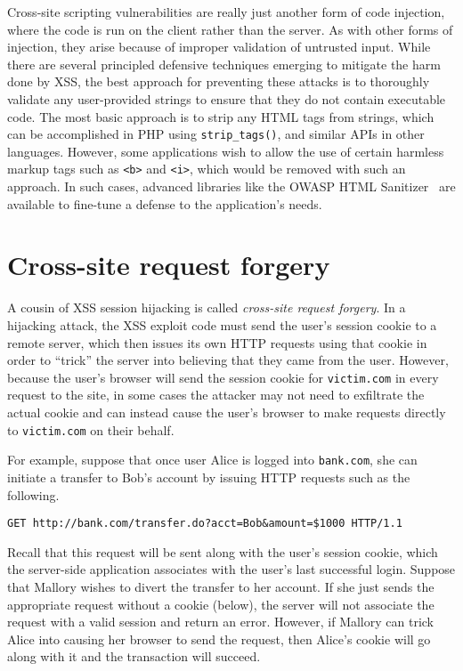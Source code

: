 \documentclass[11pt,twoside]{scrartcl}
\begin{document}
Cross-site scripting vulnerabilities are really just another form of code injection, where the code is run on the client rather than the server. As with other forms of injection, they arise because of improper validation of untrusted input. While there are several principled defensive techniques emerging to mitigate the harm done by XSS, the best approach for preventing these attacks is to thoroughly validate any user-provided strings to ensure that they do not contain executable code. The most basic approach is to strip any HTML tags from strings, which can be accomplished in PHP using \verb'strip_tags()', and similar APIs in other languages. However, some applications wish to allow the use of certain harmless markup tags such as \verb'<b>' and \verb'<i>', which would be removed with such an approach. In such cases, advanced libraries like the OWASP HTML Sanitizer~\cite{owasphtml} are available to fine-tune a defense to the application's needs.

\section{Cross-site request forgery} 
A cousin of XSS session hijacking is called \emph{cross-site request forgery}. In a hijacking attack, the XSS exploit code must send the user's session cookie to a remote server, which then issues its own HTTP requests using that cookie in order to ``trick'' the server into believing that they came from the user. However, because the user's browser will send the session cookie for \verb'victim.com' in every request to the site, in some cases the attacker may not need to exfiltrate the actual cookie and can instead cause the user's browser to make requests directly to \verb'victim.com' on their behalf.

For example, suppose that once user Alice is logged into \verb'bank.com', she can initiate a transfer to Bob's account by issuing HTTP requests such as the following.
\begin{verbatim}
GET http://bank.com/transfer.do?acct=Bob&amount=$1000 HTTP/1.1
\end{verbatim}
Recall that this request will be sent along with the user's session cookie, which the server-side application associates with the user's last successful login. Suppose that Mallory wishes to divert the transfer to her account. If she just sends the appropriate request without a cookie (below), the server will not associate the request with a valid session and return an error. However, if Mallory can trick Alice into causing her browser to send the request, then Alice's cookie will go along with it and the transaction will succeed.
\end{document}
